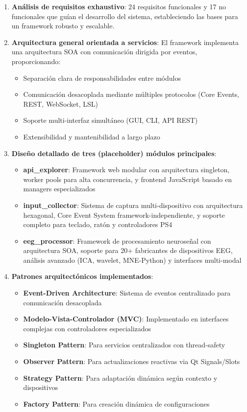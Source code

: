 \begin{enumerate}
    \item \textbf{Análisis de requisitos exhaustivo}: 24 requisitos funcionales y 17 no funcionales que guían el desarrollo del sistema, estableciendo las bases para un framework robusto y escalable.

    \item \textbf{Arquitectura general orientada a servicios}: El framework implementa una arquitectura SOA con comunicación dirigida por eventos, proporcionando:
    \begin{itemize}
        \item Separación clara de responsabilidades entre módulos
        \item Comunicación desacoplada mediante múltiples protocolos (Core Events, REST, WebSocket, LSL)
        \item Soporte multi-interfaz simultáneo (GUI, CLI, API REST)
        \item Extensibilidad y mantenibilidad a largo plazo
    \end{itemize}

    \item \textbf{Diseño detallado de tres (placeholder) módulos principales}:
    \begin{itemize}
        \item \textbf{api\_explorer}: Framework web modular con arquitectura singleton, worker pools para alta concurrencia, y frontend JavaScript basado en managers especializados
        \item \textbf{input\_collector}: Sistema de captura multi-dispositivo con arquitectura hexagonal, Core Event System framework-independiente, y soporte completo para teclado, ratón y controladores PS4
        \item \textbf{eeg\_processor}: Framework de procesamiento neuroseñal con arquitectura SOA, soporte para 20+ fabricantes de dispositivos EEG, análisis avanzado (ICA, wavelet, MNE-Python) y interfaces multi-modal
    \end{itemize}

    \item \textbf{Patrones arquitectónicos implementados}:
    \begin{itemize}
        \item \textbf{Event-Driven Architecture}: Sistema de eventos centralizado para comunicación desacoplada
        \item \textbf{Modelo-Vista-Controlador (MVC)}: Implementado en interfaces complejas con controladores especializados
        \item \textbf{Singleton Pattern}: Para servicios centralizados con thread-safety
        \item \textbf{Observer Pattern}: Para actualizaciones reactivas via Qt Signals/Slots
        \item \textbf{Strategy Pattern}: Para adaptación dinámica según contexto y dispositivos
        \item \textbf{Factory Pattern}: Para creación dinámica de configuraciones
    \end{itemize}


\end{enumerate}
